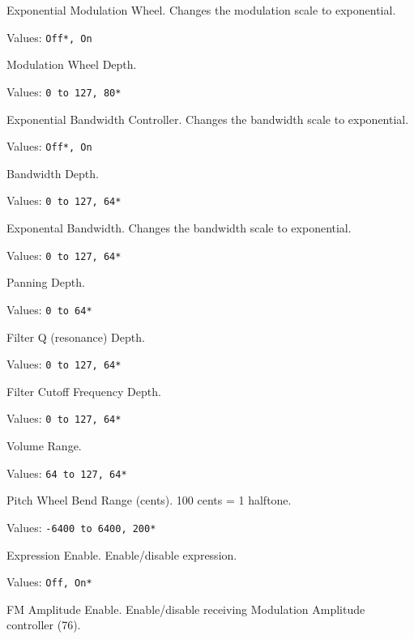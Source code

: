    \setcounter{ItemCounter}{0}      %

   Exponential Modulation Wheel.
   Changes the modulation scale to exponential.

   Values: \texttt{Off*, On}

   Modulation Wheel Depth.

   Values: \texttt{0 to 127, 80*}

   Exponential Bandwidth Controller.
   Changes the bandwidth scale to exponential.

   Values: \texttt{Off*, On}

   Bandwidth Depth.

   Values: \texttt{0 to 127, 64*}

   Exponental Bandwidth.
   Changes the bandwidth scale to exponential.

   Values: \texttt{0 to 127, 64*}

   Panning Depth.

   Values: \texttt{0 to 64*}

   Filter Q (resonance) Depth.

   Values: \texttt{0 to 127, 64*}

   Filter Cutoff Frequency Depth.

   Values: \texttt{0 to 127, 64*}

   Volume Range.

   Values: \texttt{64 to 127, 64*}

   Pitch Wheel Bend Range (cents).
   100 cents = 1 halftone.

   Values: \texttt{-6400 to 6400, 200*}

   Expression Enable.
   Enable/disable expression.

   Values: \texttt{Off, On*}

   FM Amplitude Enable.
   Enable/disable receiving Modulation Amplitude controller (76).

